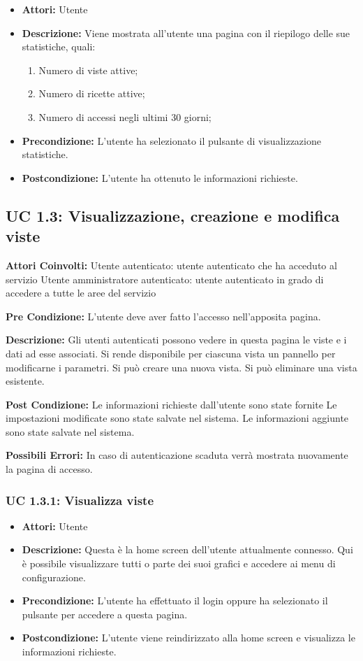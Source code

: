 \begin{itemize}
\item \textbf{Attori:} Utente
\item \textbf{Descrizione:} Viene mostrata all'utente una pagina con il riepilogo delle sue statistiche, quali:
\begin{enumerate}
\item Numero di viste attive;
\item Numero di ricette attive;
\item Numero di accessi negli ultimi 30 giorni;
\end{enumerate}
\item \textbf{Precondizione:} L'utente ha selezionato il pulsante di visualizzazione statistiche.
\item \textbf{Postcondizione:} L'utente ha ottenuto le informazioni richieste.
\end{itemize}



\subsection{UC 1.3: Visualizzazione, creazione e modifica viste}

\textbf{Attori Coinvolti:}
Utente autenticato: utente autenticato che ha acceduto al servizio
Utente amministratore autenticato: utente autenticato in grado di accedere a tutte le aree del servizio

\textbf{Pre Condizione:}
L’utente deve aver fatto l’accesso nell’apposita pagina.

\textbf{Descrizione:}
Gli utenti autenticati possono vedere in questa pagina le viste e i dati ad esse associati. 
Si rende disponibile per ciascuna vista un pannello per modificarne i parametri. 
Si può creare una nuova vista. 
Si può eliminare una vista esistente.

\textbf{Post Condizione:}
Le informazioni richieste dall’utente sono state fornite
Le impostazioni modificate sono state salvate nel sistema.
Le informazioni aggiunte sono state salvate nel sistema.

\textbf{Possibili Errori:}    
In caso di autenticazione scaduta verrà mostrata nuovamente la pagina di accesso.

\subsubsection{UC 1.3.1: Visualizza viste}

\begin{itemize}
\item \textbf{Attori:} Utente
\item \textbf{Descrizione:} Questa è la home screen dell'utente attualmente connesso. Qui è possibile visualizzare tutti o parte dei suoi grafici e accedere ai menu di configurazione.
\item \textbf{Precondizione:} L'utente ha effettuato il login oppure ha selezionato il pulsante per accedere a questa pagina.
\item \textbf{Postcondizione:} L'utente viene reindirizzato alla home screen e visualizza le informazioni richieste.
\end{itemize}

